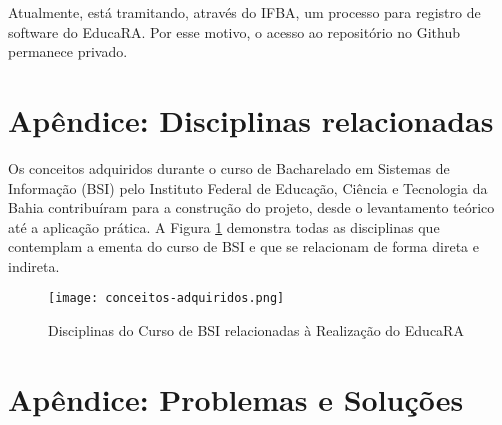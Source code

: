 \documentclass[12pt]{article}
\begin{document}
Atualmente, está tramitando, através do IFBA, um processo para registro de software do EducaRA. Por esse motivo, o acesso ao repositório no Github permanece privado. 




\newpage

\appendix

\section{Apêndice: Disciplinas relacionadas}
\label{sec:disciplinas_relacionadas}

Os conceitos adquiridos durante o curso de Bacharelado em Sistemas de Informação (BSI) pelo Instituto Federal de Educação, Ciência e Tecnologia da Bahia contribuíram para a construção do projeto, desde o levantamento teórico até a aplicação prática. A Figura \ref{fig:disciplinas} demonstra todas as disciplinas que contemplam a ementa do curso de BSI e que se relacionam de forma direta e indireta.

\begin{figure}[ht]
\centering
\texttt{[image: conceitos-adquiridos.png]}
\caption{Disciplinas do Curso de BSI relacionadas à Realização do EducaRA}
\label{fig:disciplinas}
\end{figure}

\newpage

\section{Apêndice: Problemas e Soluções}
\label{sec:apendice_problemas}
\end{document}
